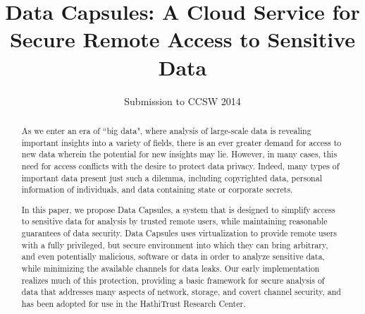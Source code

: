 \documentclass{acm_proc_article-sp}
\begin{document}
\title{Data Capsules: A Cloud Service for Secure Remote Access to Sensitive Data}

\author{
Submission to CCSW 2014
}

%

\maketitle
\begin{abstract}

As we enter an era of ``big data", where analysis of large-scale data is
revealing important insights into a variety of fields, there is an ever greater
demand for access to new data wherein the potential for new insights may lie.
However, in many cases, this need for access conflicts with the desire to
protect data privacy.  Indeed, many types of important data present just such a
dilemma, including copyrighted data, personal information of individuals, and
data containing state or corporate secrets.

In this paper, we propose Data Capsules, a system that is designed to simplify
access to sensitive data for analysis by trusted remote users, while
maintaining reasonable guarantees of data security.  Data Capsules uses
virtualization to provide remote users with a fully privileged, but secure
environment into which they can bring arbitrary, and even potentially
malicious, software or data in order to analyze sensitive data, while
minimizing the available channels for data leaks.  Our early implementation
realizes much of this protection, providing a basic framework for secure
analysis of data that addresses many aspects of network, storage, and covert
channel security, and has been adopted for use in the HathiTrust Research
Center.

\end{abstract}
\end{document}
